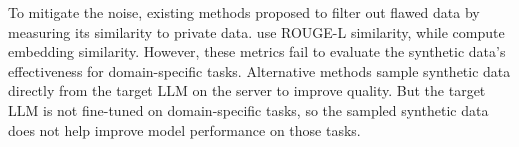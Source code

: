 To mitigate the noise, existing methods \citep{Wang2022SelfInstructAL, dayu2024privacy, Xie2024DifferentiallyPS} proposed to filter out flawed data by measuring its similarity to private data. 
\citet{Wang2022SelfInstructAL} use ROUGE-L similarity, while \citet{dayu2024privacy, Xie2024DifferentiallyPS} compute embedding similarity. 
However, these metrics fail to evaluate the synthetic data's effectiveness for domain-specific tasks. 
Alternative methods \citep{lifederatedSD24, Wang2024KnowledgeSGPS} sample synthetic data directly from the target LLM on the server to improve quality.  
But the target LLM is not fine-tuned on domain-specific tasks, so the sampled synthetic data does not help improve model performance on those tasks.




